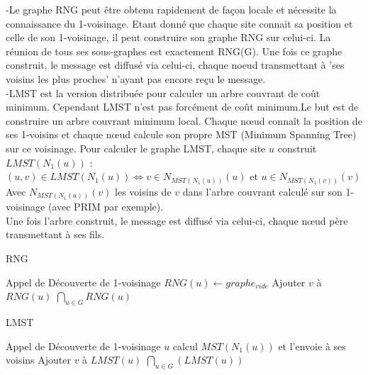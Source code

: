 -Le graphe RNG peut être obtenu rapidement de façon locale et nécessite la connaissance du 1-voisinage. Etant donné
que chaque site connait sa position et celle de son 1-voisinage, il peut construire son graphe RNG sur celui-ci. La
réunion de tous ses sous-graphes est exactement RNG(G). Une fois ce graphe construit, le message est diffusé via 
celui-ci, chaque noeud  transmettant à 'ses voisins les plus proches' n'ayant pas encore reçu le message.\\

-LMST est la version distribuée pour calculer un arbre couvrant de coût minimum. Cependant LMST n'est pas forcément de 
coût minimum.Le but est de construire un arbre couvrant minimum local. Chaque nœud connaît la position de ses 1-voisins 
 et chaque nœud calcule son propre MST (Minimum Spanning Tree) sur ce voisinage.
Pour calculer le graphe LMST, chaque site $u$ construit $LMST(N_1(u))$ : \\
 $(u,v) \in LMST(N_1(u)) \Leftrightarrow v \in N_{MST(N_1(u))}(u)$ et $ u \in N_{MST(N_1(v))}(v)$\\
Avec $N_{MST(N_1(u))}(v)$ les voisins de $v$ dans l'arbre couvrant calculé sur son 1-voisinage (avec PRIM par exemple).\\
Une fois l'arbre construit, le message est diffusé via celui-ci, chaque nœud père transmettant à ses fils.




\begin{algorithm}[h]
\caption{RNG}
\label{RNG}
\begin{algorithmic}
	\STATE Appel de Découverte de 1-voisinage
\ENDFOR
{}
	\STATE  $RNG(u) \leftarrow graphe_{vide}$
	    \STATE Ajouter $v$ à $RNG(u)$
	  \ENDIF
        \ENDFOR
\ENDFOR
\RETURN $\bigcap_{u \in G} RNG(u)$
\end{algorithmic}
\end{algorithm}

\begin{algorithm}[h]
\caption{LMST}
\label{LMST}
\begin{algorithmic}
	\STATE Appel de Découverte de 1-voisinage
	\STATE $u$ calcul $MST(N_1(u))$ et l'envoie à ses voisins
\ENDFOR
{}
	    \STATE Ajouter $v$ à $LMST(u)$
	  \ENDIF
        \ENDFOR
\ENDFOR
\RETURN $\bigcap_{u \in G}( LMST(u))$
\end{algorithmic}
\end{algorithm}


